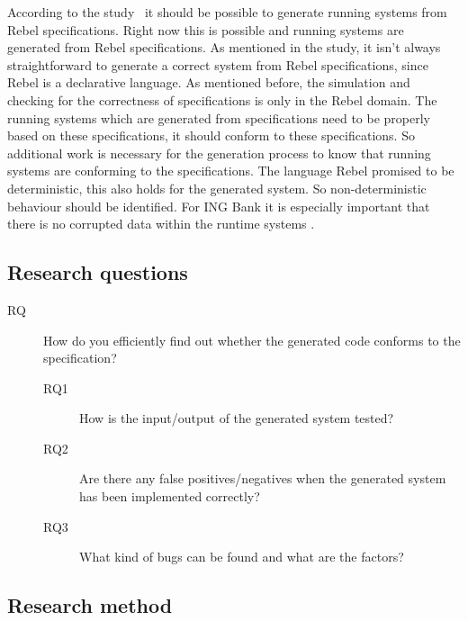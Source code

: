 According to the study~\cite[p.3]{stoelcase} it should be possible to generate
running systems from Rebel specifications. Right now this is possible and
running systems are generated from Rebel specifications. As mentioned in the
study, it isn't always straightforward to generate a correct system from Rebel
specifications, since Rebel is a declarative language.
As mentioned before, the simulation and checking for the correctness of
specifications is only in the Rebel domain. The running systems which are
generated from specifications need to be properly based on these specifications,
it should conform to these specifications. So additional work is necessary for
the generation process to know that running systems are conforming to the
specifications. The language Rebel promised to be deterministic, this also holds
for the generated system. So non-deterministic behaviour should be identified.
For ING Bank it is especially important that there is no corrupted data within
the runtime systems .

\subsection{Research questions}\label{sec:research-questions}

\begin{description}
  \item [RQ] How do you efficiently find out whether the generated code conforms
  to the specification?

  \begin{description}
    \item [RQ1] How is the input/output of the generated system tested?
    \item [RQ2] Are there any false positives/negatives when the generated
    system has been implemented correctly?
    \item [RQ3] What kind of bugs can be found and what are the factors?
  \end{description}

\end{description}

\subsection{Research method}\label{sec:research-method}

